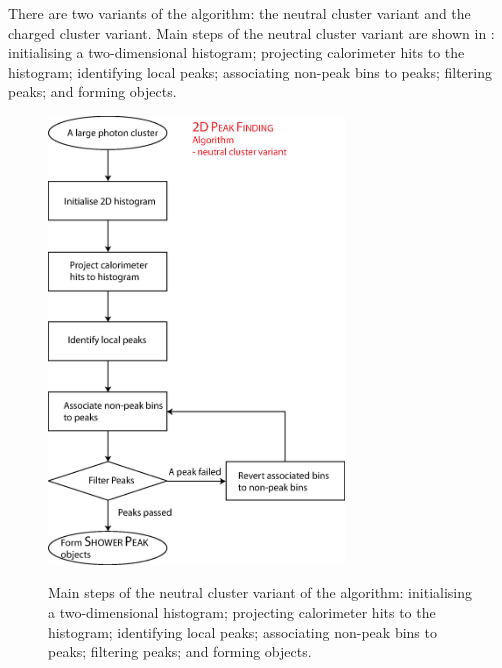 
There are two variants of the \peakFinding algorithm: the neutral cluster variant and the charged cluster variant. Main steps of the neutral cluster variant are shown in : initialising a two-dimensional histogram; projecting  calorimeter hits to the histogram; identifying local peaks; associating non-peak bins to peaks; filtering peaks; and forming \ShowerPeak objects.


\begin{figure}[tbph]
\centering
{\includegraphics[width=0.7\textwidth]{photon/2DpeakFinding2}}
\caption[Flow chart for \peakFinding algorithm neutral cluster variant.]
{Main steps of the  neutral cluster variant of the \peakFinding algorithm: initialising a two-dimensional histogram; projecting  calorimeter hits to the histogram; identifying local peaks; associating non-peak bins to peaks; filtering peaks; and forming \ShowerPeak objects.}
\label{fig:photonPeakFindingFlowNeutral}
\end{figure}

